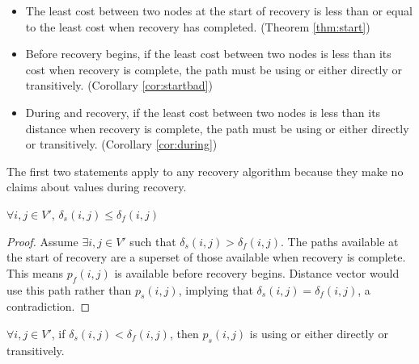 {\begin{itemize}
	\item The least cost between two nodes at the start of recovery is less than or equal to the least cost when recovery has completed. (Theorem \ref{thm:start})

	\item Before recovery begins, if the least cost between two nodes is less than its cost when recovery is complete, the path must 
  be using \badvector or \oldvector either directly or transitively. (Corollary \ref{cor:startbad})

	\item During \second and \cpr recovery, if the least cost between two nodes is less than its distance when recovery is complete, the path must 
  be using \badvector or \oldvector either directly or transitively. (Corollary \ref{cor:during})


\end{itemize}
The first two statements apply to any recovery algorithm because they make no claims about \minv values during recovery. 

\begin{theorem}
\label{thm:start}
$\forall i,j\in V'$, $ \delta_s(i,j) \leq \delta_f(i,j)$
\end{theorem}
\begin{proof}
Assume $\exists i,j \in V'$ such that $\delta_s(i,j) > \delta_f(i,j)$.  The paths available at the start of recovery are a superset of 
those available when recovery is complete. This means $p_f(i,j)$ is available before recovery begins. Distance vector would use this path rather
than $p_s(i,j)$, implying that $\delta_s(i,j)=\delta_f(i,j)$, a contradiction. 
\end{proof}

\begin{corollary}
\label{cor:startbad}
$\forall i,j \in V'$, if $\delta_s(i,j) < \delta_f(i,j)$, then $p_s(i,j)$ is using \badvector or \oldvector either directly or transitively.
\end{corollary}

}
